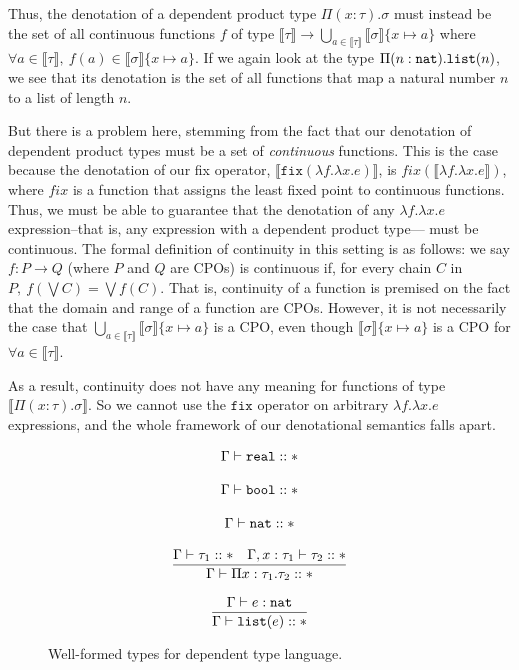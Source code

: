 Thus, the denotation of a dependent product type $\Pi(x:\tau).\sigma$ must instead be the set of all
continuous functions $f$ 
of type $\llbracket \tau \rrbracket \rightarrow \bigcup_{a \in \llbracket \tau \rrbracket} \llbracket \sigma \rrbracket\{x \mapsto a\}$
where $\forall a \in \llbracket \tau \rrbracket, \ f(a) \in \llbracket \sigma \rrbracket\{x \mapsto a\}$. If we again look at the 
type $\Pi(n:\texttt{nat}).\texttt{list}(n)$, we see that its denotation is the set of all functions that map a natural number $n$ 
to a list of length $n$.

But there is a problem here, stemming from the fact that our denotation of dependent product types must be a 
set of \emph{continuous} functions. This is the case because the denotation of our fix operator,
$\llbracket \texttt{fix}(\lambda f. \lambda x.e) \rrbracket$, is $fix(\llbracket \lambda f. \lambda x.e \rrbracket)$, where $fix$ 
is a function that assigns the least fixed point to continuous functions. Thus, we must be able to guarantee that the denotation of any $\lambda f. \lambda x.e$ expression--that is, any expression with a dependent product type--- must be continuous. The formal definition of continuity in this setting is as 
follows: we say $f: P \rightarrow Q$ (where $P$ and $Q$ are CPOs) is continuous if, for every chain $C$ in $P, \ 
f(\bigvee C) = \bigvee f(C)$. That is, continuity of a function is premised on the fact that the domain and range of
a function are CPOs. However, it is not necessarily the case that
 $\bigcup_{a \in \llbracket \tau \rrbracket} \llbracket \sigma \rrbracket\{ x \mapsto a\}$ is a CPO, even though 
 $\llbracket \sigma \rrbracket\{x\mapsto a\}$ is a CPO for $\forall a \in \llbracket \tau \rrbracket$.

As a result, continuity does not have any meaning for functions of type $\llbracket \Pi (x: \tau).\sigma \rrbracket$. 
So we cannot use the $\texttt{fix}$ operator on arbitrary $\lambda f. \lambda x.e$ expressions, and the whole
framework of our denotational semantics falls apart. 
 
 \begin{figure}
\[
\begin{array}{c}
\Gamma \vdash \texttt{real} :: * \\ \\
\Gamma \vdash \texttt{bool} :: *\\ \\
\Gamma \vdash \texttt{nat} :: * \\ \\ 
\dfrac{\Gamma \vdash \tau_1 :: * \ \ \ \Gamma, x:\tau_1 \vdash \tau_2 :: *}{\Gamma \vdash \Pi x:\tau_1.\tau_2 :: *} \\ \\
\dfrac{\Gamma \vdash e : \texttt{nat}}{\Gamma \vdash \texttt{list}(e) :: *} 
\end{array}
\]
\caption{Well-formed types for dependent type language.}
\end{figure}

